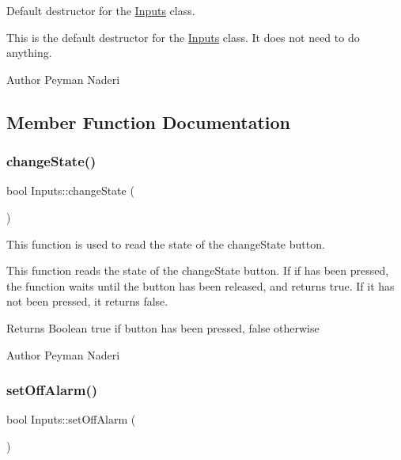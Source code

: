 Default destructor for the \hyperlink{classInputs}{Inputs} class. 

This is the default destructor for the \hyperlink{classInputs}{Inputs} class. It does not need to do anything.

\begin{DoxyAuthor}{Author}
Peyman Naderi 
\end{DoxyAuthor}


\subsection{Member Function Documentation}
\mbox{\label{classInputs_a44cce4556cf69290e76ed0195956a95d}} 
\subsubsection{\texorpdfstring{change\+State()}{changeState()}}
{\footnotesize\ttfamily bool Inputs\+::change\+State (\begin{DoxyParamCaption}{ }\end{DoxyParamCaption})\hspace{0.3cm}{\ttfamily [private]}}



This function is used to read the state of the change\+State button. 

This function reads the state of the change\+State button. If if has been pressed, the function waits until the button has been released, and returns true. If it has not been pressed, it returns false.

\begin{DoxyReturn}{Returns}
Boolean true if button has been pressed, false otherwise 
\end{DoxyReturn}
\begin{DoxyAuthor}{Author}
Peyman Naderi 
\end{DoxyAuthor}
\mbox{\label{classInputs_a28390ec77ba03612f444292e5a13642a}} 
\subsubsection{\texorpdfstring{set\+Off\+Alarm()}{setOffAlarm()}}
{\footnotesize\ttfamily bool Inputs\+::set\+Off\+Alarm (\begin{DoxyParamCaption}{ }\end{DoxyParamCaption})\hspace{0.3cm}{\ttfamily [private]}}



